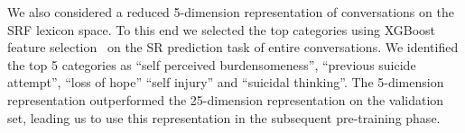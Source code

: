\documentclass[letterpaper]{article} %
\begin{document}

We also considered a  reduced 5-dimension representation of conversations on the SRF lexicon space.  To this end we selected the  top categories using XGBoost feature selection~\cite{chen2016xgboost} on the SR prediction task of entire conversations. 
We identified the top 5 categories as ``self perceived burdensomeness'', ``previous suicide attempt'', ``loss of hope'' ``self injury'' and ``suicidal thinking''.  The 5-dimension representation outperformed the 25-dimension representation on the validation set, leading us to use  this representation in the subsequent pre-training phase. 



\end{document}
